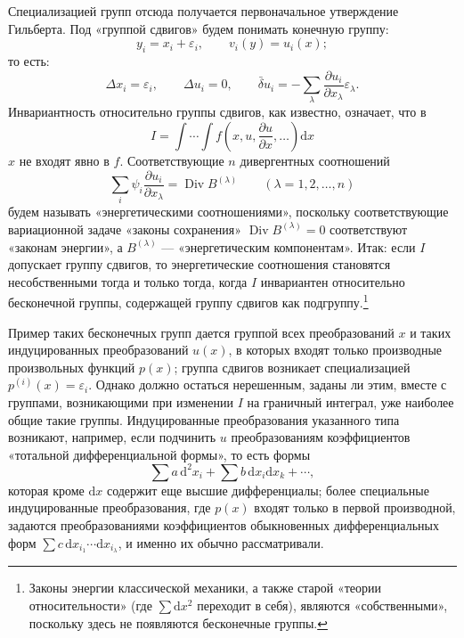 \documentclass[11pt]{article}
\providecommand{\eps}{\varepsilon}
\providecommand{\D}{\Delta}
\providecommand{\p}{\partial}
\providecommand{\dd}{\mathrm d}
\DeclareMathOperator{\Div}{Div}
\providecommand{\bd}{\bar{\delta}}
\begin{document}
Специализацией групп отсюда получается первоначальное утверждение Гильберта. Под «группой сдвигов» будем понимать конечную группу:
\[
y_i=x_i+\eps_i,\qquad v_i(y)=u_i(x);
\]
то есть:
\[
\D x_i=\eps_i,\qquad \D u_i=0,\qquad
\bd u_i=-\sum_\lambda\frac{\p u_i}{\p x_\lambda}\eps_\lambda.
\]
Инвариантность относительно группы сдвигов, как известно, означает, что в
\[
I=\int\!\cdots\!\int f\!\left(x,u,\frac{\p u}{\p x},\ldots\right)\dd x
\]
\(x\) не входят явно в \(f\). Соответствующие \(n\) дивергентных соотношений
\[
\sum_i\psi_i\frac{\p u_i}{\p x_\lambda}=\Div B^{(\lambda)}
\qquad(\lambda=1,2,\ldots,n)
\]
будем называть «энергетическими соотношениями», поскольку соответствующие вариационной задаче «законы сохранения» \(\Div B^{(\lambda)}=0\) соответствуют «законам энергии», а \(B^{(\lambda)}\) --- «энергетическим компонентам». Итак: если \(I\) допускает группу сдвигов, то энергетические соотношения становятся несобственными тогда и только тогда, когда \(I\) инвариантен относительно бесконечной группы, содержащей группу сдвигов как подгруппу.\footnote{Законы энергии классической механики, а также старой «теории относительности» (где \(\sum \dd x^2\) переходит в себя), являются «собственными», поскольку здесь не появляются бесконечные группы.}

Пример таких бесконечных групп дается группой всех преобразований \(x\) и таких индуцированных преобразований \(u(x)\), в которых входят только производные произвольных функций \(p(x)\); группа сдвигов возникает специализацией \(p^{(i)}(x)=\eps_i\). Однако должно остаться нерешенным, заданы ли этим, вместе с группами, возникающими при изменении \(I\) на граничный интеграл, уже наиболее общие такие группы. Индуцированные преобразования указанного типа возникают, например, если подчинить \(u\) преобразованиям коэффициентов «тотальной дифференциальной формы», то есть формы
\[
\sum a\,\dd^2x_i+\sum b\,\dd x_i\dd x_k+\cdots,
\]
которая кроме \(\dd x\) содержит еще высшие дифференциалы; более специальные индуцированные преобразования, где \(p(x)\) входят только в первой производной, задаются преобразованиями коэффициентов обыкновенных дифференциальных форм \(\sum c\,\dd x_{i_1}\cdots \dd x_{i_\lambda}\), и именно их обычно рассматривали.
\end{document}
